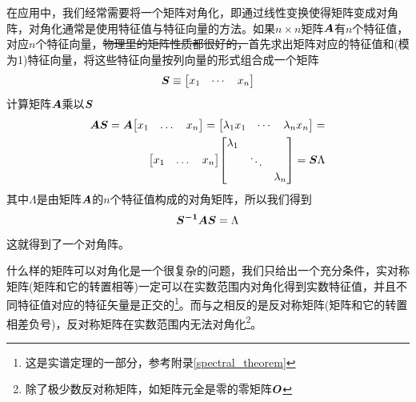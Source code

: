 \documentclass[12pt,a4paper,openany,twoside]{book}
\numberwithin{equation}{section}
\begin{document}
            在应用中，我们经常需要将一个矩阵对角化，即通过线性变换使得矩阵变成对角阵，对角化通常是使用特征值与特征向量的方法。如果$n\times n$矩阵$\vb*{A}$有$n$个特征值，对应$n$个特征向量，\sout{物理里的矩阵性质都很好的，}首先求出矩阵对应的特征值和(模为1)特征向量，将这些特征向量按列向量的形式组合成一个矩阵
            \begin{equation*}
              \vb*{S}\equiv\mqty[x_1 & \cdots & x_n]
            \end{equation*}
            计算矩阵$\vb*{A}$乘以$\vb*{S}$
            \begin{equation}
              \begin{aligned}
                \vb*{A S}=\vb*{A}\mqty[x_1 & \dots & x_n]=\mqty[\lambda_1 x_1 & \cdots & \lambda_n x_n]= \\
                \mqty[x_1 & \dots & x_n] \mqty[
                  \lambda_1 & {} & {} \\
                  {} & \ddots & {} \\
                  {} & {} & \lambda_n
                ]=\vb*{S }\Lambda
              \end{aligned}
            \end{equation}
            其中$\Lambda$是由矩阵$\vb*{A}$的$n$个特征值构成的对角矩阵，所以我们得到
            \begin{equation}
              \vb*{S^{-1}AS}=\Lambda
            \end{equation}
            这就得到了一个对角阵。

            什么样的矩阵可以对角化是一个很复杂的问题，我们只给出一个充分条件，实对称矩阵(矩阵和它的转置相等)一定可以在实数范围内对角化得到实数特征值，并且不同特征值对应的特征矢量是正交的\footnote{这是实谱定理的一部分，参考附录\ref{spectral_theorem}}。而与之相反的是反对称矩阵(矩阵和它的转置相差负号)，反对称矩阵在实数范围内无法对角化\footnote{除了极少数反对称矩阵，如矩阵元全是零的零矩阵$\vb*{O}$}。
      
\end{document}
